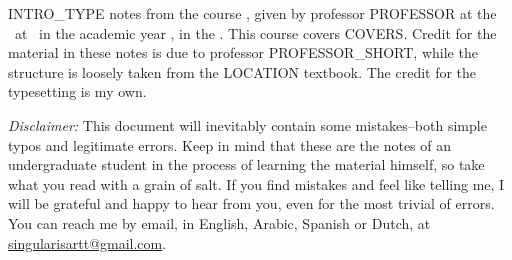 INTRO_TYPE notes from the course \MyTitle, given by professor PROFESSOR at the \faculty~at \location~in the academic year \academicyear, in the \term. This course covers COVERS. Credit for the material in these notes is due to professor PROFESSOR_SHORT, while the structure is loosely taken from the LOCATION textbook. The credit for the typesetting is my own.

\textit{Disclaimer:} This document will inevitably contain some mistakes--both simple typos and legitimate errors. Keep in mind that these are the notes of an undergraduate student in the process of learning the material himself, so take what you read with a grain of salt. If you find mistakes and feel like telling me, I will be grateful and happy to hear from you, even for the most trivial of errors. You can reach me by email, in English, Arabic, Spanish or Dutch, at \href{mailto:singularisartt@gmail.com}{singularisartt@gmail.com}.
